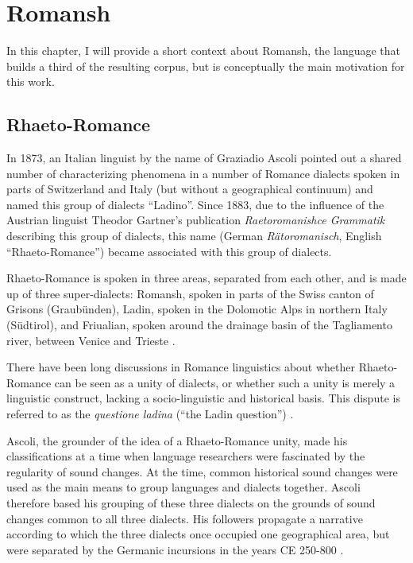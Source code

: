 \chapter{Romansh}\label{chap:romansh}

In this chapter, I will provide a short context about Romansh, the language that builds a third of the resulting corpus, but is conceptually the main motivation for this work.

\section{Rhaeto-Romance}\label{sec:rhaeto-romance}
In 1873, an Italian linguist by the name of Graziadio Ascoli pointed out a shared number of characterizing phenomena in a number of Romance dialects spoken in parts of Switzerland and Italy (but without a geographical continuum) and named this group of dialects \enquote{Ladino}. Since 1883, due to the influence of the Austrian linguist Theodor Gartner's publication \emph{Raetoromanishce Grammatik} describing this group of dialects, this name (German \emph{Rätoromanisch}, English \enquote{Rhaeto-Romance}) became associated with this group of dialects. 

Rhaeto-Romance is spoken in three areas, separated from each other, and is made up of three super-dialects: Romansh, spoken in parts of the Swiss canton of Grisons (Graubünden), Ladin, spoken in the Dolomotic Alps in northern Italy (Südtirol), and Friualian, spoken around the drainage basin of the Tagliamento river, between Venice and Trieste \autocite[1]{haiman1992}.

There have been long discussions in Romance linguistics about whether Rhaeto-Romance can be seen as a unity of dialects, or whether such a unity is merely a linguistic construct, lacking a socio-linguistic and historical basis. 
This dispute is referred to as the \emph{questione ladina} (\enquote{the Ladin question}) \autocite{liver1999}. 

Ascoli, the grounder of the idea of a Rhaeto-Romance unity, made his classifications at a time when language researchers were fascinated by the regularity of sound changes. At the time,  common historical sound changes were used as the main means to group languages and dialects together. Ascoli therefore based his grouping of these three dialects on the grounds of sound changes common to all three dialects. 
His followers propagate a narrative according to which the three dialects once occupied one geographical area, but were separated by the Germanic incursions in the years CE 250-800 \autocites[174]{bossong2008}[11]{haiman1992}.

